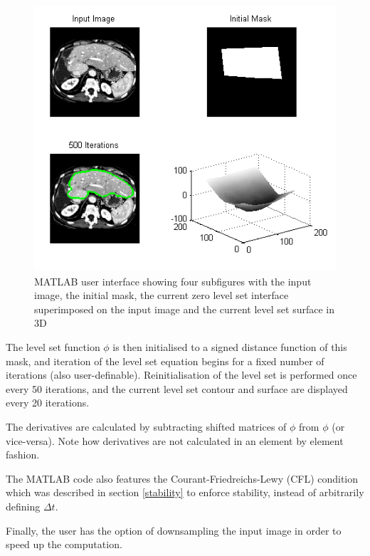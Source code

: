 \begin{figure}[h]
	\centering
		\includegraphics[scale=0.6]{images/matlab.png}
	\caption{MATLAB user interface showing four subfigures with the input image, the initial mask, the current zero level set interface superimposed on the input image and the current level set surface in 3D}
	\label{fig:matlab}
\end{figure}

The level set function $\phi$ is then initialised to a signed distance function of this mask, and iteration of the level set equation begins for a fixed number of iterations (also user-definable). Reinitialisation of the level set is performed once every 50 iterations, and the current level set contour and surface are displayed every 20 iterations.

The derivatives are calculated by subtracting shifted matrices of $\phi$ from $\phi$ (or vice-versa). Note how derivatives are not calculated in an element by element fashion.

The MATLAB code also features the Courant-Friedreichs-Lewy (CFL) condition which was described in section \ref{stability} to enforce stability, instead of arbitrarily defining $\Delta t$.

Finally, the user has the option of downsampling the input image in order to speed up the computation.

